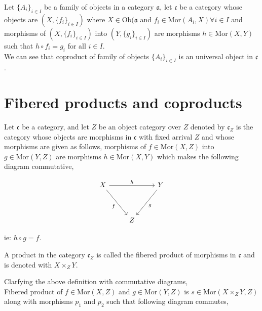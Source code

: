 \documentclass[11pt,a4paper]{colorart}
\def\mab{\mathfrak}
\def\oo{\circ}
\begin{document}
\newpage

\begin{example}
	Let $\{A_i\}_{i \in I}$ be a family of objects in a category $\mab{a}$, let $\mab{c}$ be a category whose objects are $(X, \{f_i\}_{i \in I})$ where $X \in \text{Ob}(\mab{a}$ and $f_i \in \text{Mor}(A_i,X) \forall i \in I$ and morphisms of $(X, \{f_i\}_{i \in I})$ into $(Y, \{g_i\}_{i \in I})$ are morphisms $h \in \text{Mor}(X,Y)$ such that $h \oo f_i = g_i $ for all $i \in I$. \\

	We can see that coproduct of family of objects $\{A_i\}_{i \in I}$ is an universal object in $\mab{c}$.
\end{example}

\section{Fibered products and coproducts}

\begin{definition}
	Let $\mab{c}$ be a category, and let $Z$ be an object category over $Z$ denoted by $\mab{c}_Z$ is the category whose objects are morphisms in $\mab{c}$ with fixed arrival $Z$ and whose morphisms are given as follows, morphisms of $f \in \text{Mor}(X,Z)$ into $g \in \text{Mor}(Y,Z)$ are morphisms $h \in \text{Mor}(X,Y)$ which makes the following diagram commutative,

\[\begin{tikzcd}
	X && Y \\
	\\
	& Z
	\arrow["h", from=1-1, to=1-3]
	\arrow["f"', from=1-1, to=3-2]
	\arrow["g", from=1-3, to=3-2]
\end{tikzcd}\]

ie: $h \oo g = f$.
\end{definition}

\begin{definition}
	A product in the category $\mab{c}_Z$ is called the fibered product of morphisms in $\mab{c}$ and is denoted with $X \times_Z Y$.
\end{definition}

Clarfying the above definition with commutative diagrams, \\

Fibered product of $f \in \text{Mor}(X,Z)$ and $g \in \text{Mor}(Y,Z)$ is $s \in \text{Mor}(X\times_ZY,Z)$ along with morphisms $p_1$ and $p_2$ such that following diagram commutes,
\end{document}
